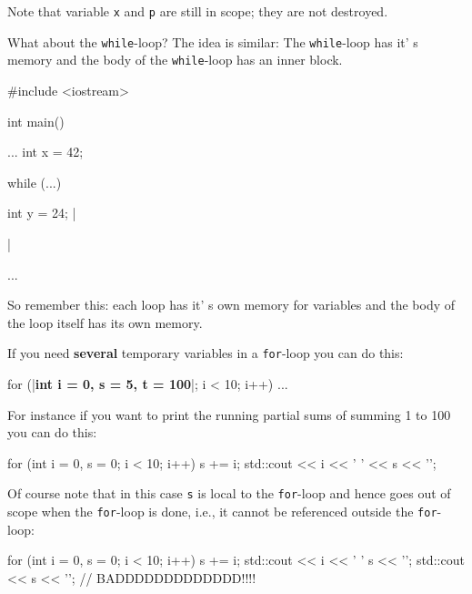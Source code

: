 Note that variable \texttt{x} and \texttt{p} are still in scope; they are not destroyed.

What about the \texttt{while}-loop? The idea is similar: The \texttt{while}-loop has it' s memory and the body of the \texttt{while}-loop has an inner block.

\begin{consolethree}[escapeinside=||]
#include <iostream>

int main()
{    
     ...
     int x = 42;

     while (...)
     {     
           int y = 24;
           ||
     }

     ...
}
\end{consolethree}

So remember this: each loop has it' s own memory for
variables and the body of the loop itself has its own memory.

If you need \textbf{several} temporary variables in a \texttt{for}-loop
you can do this:

\begin{consolethree}[escapeinside=||]
for (|\textbf{int i = 0, s = 5, t = 100}|; i < 10; i++)
{
    ...
}
\end{consolethree}

For instance if you want to print the running partial sums of summing 1
to 100 you can do this:

\begin{console}
for (int i = 0, s = 0; i < 10; i++)
{   
    s += i;
    std::cout << i << ' ' << s << '\n';
}
\end{console}

Of course note that in this case \texttt{s} is local to the \texttt{for}-loop and hence goes out of scope when the \texttt{for}-loop is done, i.e., it cannot be referenced outside the \texttt{for}-loop:

\begin{console}
for (int i = 0, s = 0; i < 10; i++)
{   
    s += i;
    std::cout << i << ' ' s << '\n';
}
std::cout << s << '\n'; // BADDDDDDDDDDDDD!!!!
\end{console}

\newpage{}

